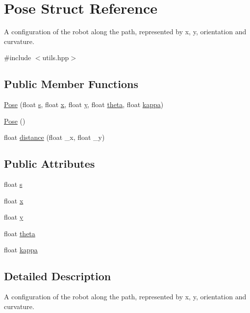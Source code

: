 \hypertarget{structPose}{}\section{Pose Struct Reference}
\label{structPose}


A configuration of the robot along the path, represented by x, y, orientation and curvature.  




{\ttfamily \#include $<$utils.\+hpp$>$}

\subsection*{Public Member Functions}
\begin{DoxyCompactItemize}
\item 
\hyperlink{structPose_a80c8e028bf0a6d815db4bbd599877f22}{Pose} (float \hyperlink{structPose_a7cafd5a1122c053e9c1ddec351dbb8f3}{s}, float \hyperlink{structPose_a2f30fe76d6747d973daff013207ca0e8}{x}, float \hyperlink{structPose_a60610dad0457edf9e1c57a787b68b632}{y}, float \hyperlink{structPose_a2e2edc8448a8f6f4a21cbd7eca63c2ff}{theta}, float \hyperlink{structPose_a4f409e1fe4ae5626042bc2942df9367a}{kappa})
\item 
\hyperlink{structPose_a8a4171c8a6b09e37fb011997da9ea2ad}{Pose} ()
\item 
float \hyperlink{structPose_a2032faa5456e2d667bac87f7f8921020}{distance} (float \+\_\+x, float \+\_\+y)
\end{DoxyCompactItemize}
\subsection*{Public Attributes}
\begin{DoxyCompactItemize}
\item 
float \hyperlink{structPose_a7cafd5a1122c053e9c1ddec351dbb8f3}{s}
\item 
float \hyperlink{structPose_a2f30fe76d6747d973daff013207ca0e8}{x}
\item 
float \hyperlink{structPose_a60610dad0457edf9e1c57a787b68b632}{y}
\item 
float \hyperlink{structPose_a2e2edc8448a8f6f4a21cbd7eca63c2ff}{theta}
\item 
float \hyperlink{structPose_a4f409e1fe4ae5626042bc2942df9367a}{kappa}
\end{DoxyCompactItemize}


\subsection{Detailed Description}
A configuration of the robot along the path, represented by x, y, orientation and curvature. 

